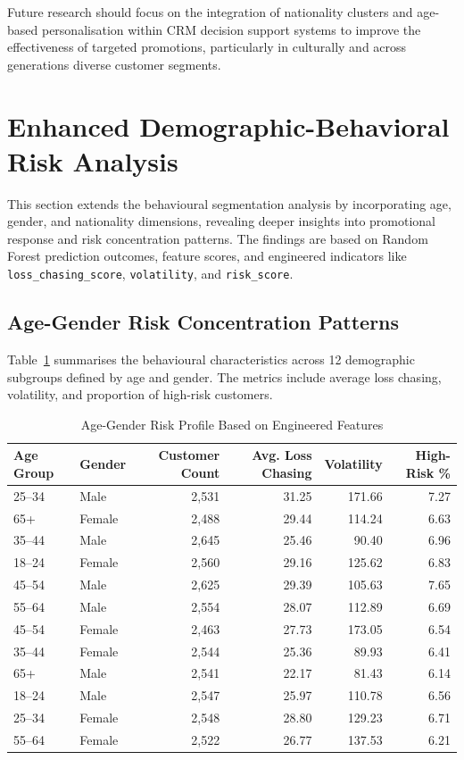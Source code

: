 \documentclass[12pt,a4paper]{report}
\begin{document}
Future research should focus on the integration of nationality clusters and age-based personalisation within CRM decision support systems to improve the effectiveness of targeted promotions, particularly in culturally and across generations diverse customer segments.


\section{Enhanced Demographic-Behavioral Risk Analysis}
\label{sec:enhanced_demographic_behavior}

This section extends the behavioural segmentation analysis by incorporating age, gender, and nationality dimensions, revealing deeper insights into promotional response and risk concentration patterns. The findings are based on Random Forest prediction outcomes, feature scores, and engineered indicators like \texttt{loss\_chasing\_score}, \texttt{volatility}, and \texttt{risk\_score}.

\subsection{Age-Gender Risk Concentration Patterns}

Table~\ref{tab:age_gender_loss_chasing_comprehensive} summarises the behavioural characteristics across 12 demographic subgroups defined by age and gender. The metrics include average loss chasing, volatility, and proportion of high-risk customers.

\begin{table}[H]
\centering
\caption{Age-Gender Risk Profile Based on Engineered Features}
\label{tab:age_gender_loss_chasing_comprehensive}
\begin{tabular}{llrrrr}
\toprule
\textbf{Age Group} & \textbf{Gender} & \textbf{Customer Count} & \textbf{Avg. Loss Chasing} & \textbf{Volatility} & \textbf{High-Risk \%} \\
\midrule
25--34 & Male & 2,531 & 31.25 & 171.66 & 7.27 \\
65+ & Female & 2,488 & 29.44 & 114.24 & 6.63 \\
35--44 & Male & 2,645 & 25.46 & 90.40 & 6.96 \\
18--24 & Female & 2,560 & 29.16 & 125.62 & 6.83 \\
45--54 & Male & 2,625 & 29.39 & 105.63 & 7.65 \\
55--64 & Male & 2,554 & 28.07 & 112.89 & 6.69 \\
45--54 & Female & 2,463 & 27.73 & 173.05 & 6.54 \\
35--44 & Female & 2,544 & 25.36 & 89.93 & 6.41 \\
65+ & Male & 2,541 & 22.17 & 81.43 & 6.14 \\
18--24 & Male & 2,547 & 25.97 & 110.78 & 6.56 \\
25--34 & Female & 2,548 & 28.80 & 129.23 & 6.71 \\
55--64 & Female & 2,522 & 26.77 & 137.53 & 6.21 \\
\bottomrule
\end{tabular}
\end{table}
\end{document}
